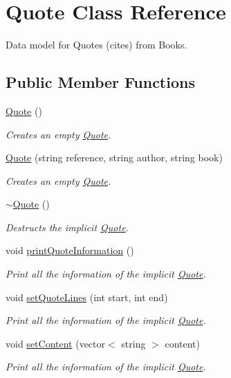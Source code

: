 \hypertarget{class_quote}{}\section{Quote Class Reference}
\label{class_quote}


Data model for Quotes (cites) from Books.  


\subsection*{Public Member Functions}
\begin{DoxyCompactItemize}
\item 
\hyperlink{class_quote_ae160077e513fe6346eeba294a195038b}{Quote} ()
\begin{DoxyCompactList}\small\item\em Creates an empty \hyperlink{class_quote}{Quote}. \end{DoxyCompactList}\item 
\hyperlink{class_quote_a12fee26be3fcdf003691e394f256b2c8}{Quote} (string reference, string author, string book)
\begin{DoxyCompactList}\small\item\em Creates an empty \hyperlink{class_quote}{Quote}. \end{DoxyCompactList}\item 
\hyperlink{class_quote_a9b4324f3ee83827f2445177c8301482b}{$\sim$\+Quote} ()
\begin{DoxyCompactList}\small\item\em Destructs the implicit \hyperlink{class_quote}{Quote}. \end{DoxyCompactList}\item 
void \hyperlink{class_quote_afdfb9eeaf4f528a5a5b8aee3e9dc47f4}{print\+Quote\+Information} ()
\begin{DoxyCompactList}\small\item\em Print all the information of the implicit \hyperlink{class_quote}{Quote}. \end{DoxyCompactList}\item 
void \hyperlink{class_quote_a211e2593b1ef18dc7fd4a5da87384fa1}{set\+Quote\+Lines} (int start, int end)
\begin{DoxyCompactList}\small\item\em Print all the information of the implicit \hyperlink{class_quote}{Quote}. \end{DoxyCompactList}\item 
void \hyperlink{class_quote_ab3af36f8b5649b115fca7eecbb294a59}{set\+Content} (vector$<$ string $>$ content)
\begin{DoxyCompactList}\small\item\em Print all the information of the implicit \hyperlink{class_quote}{Quote}. \end{DoxyCompactList}\end{DoxyCompactItemize}


